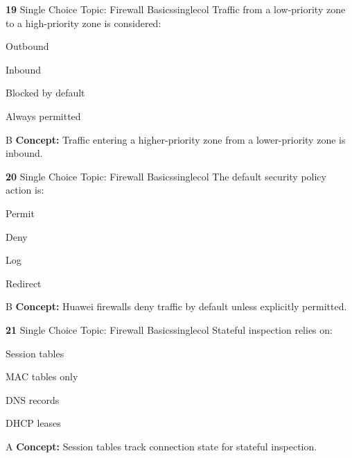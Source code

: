 \documentclass[10pt,a4paper]{article}
\begin{document}
\begin{qcard}{\color{white}\textbf{19} \hfill \small Single Choice \textbar{} Topic: Firewall Basics}{singlecol}
Traffic from a low-priority zone to a high-priority zone is considered:

\begin{qoptions}
\item Outbound
\item Inbound
\item Blocked by default
\item Always permitted
\end{qoptions}
\begin{explainbox}{B}
\textbf{Concept:} Traffic entering a higher-priority zone from a lower-priority zone is inbound.
\end{explainbox}
\end{qcard}

\begin{qcard}{\color{white}\textbf{20} \hfill \small Single Choice \textbar{} Topic: Firewall Basics}{singlecol}
The default security policy action is:

\begin{qoptions}
\item Permit
\item Deny
\item Log
\item Redirect
\end{qoptions}
\begin{explainbox}{B}
\textbf{Concept:} Huawei firewalls deny traffic by default unless explicitly permitted.
\end{explainbox}
\end{qcard}

\begin{qcard}{\color{white}\textbf{21} \hfill \small Single Choice \textbar{} Topic: Firewall Basics}{singlecol}
Stateful inspection relies on:

\begin{qoptions}
\item Session tables
\item MAC tables only
\item DNS records
\item DHCP leases
\end{qoptions}
\begin{explainbox}{A}
\textbf{Concept:} Session tables track connection state for stateful inspection.
\end{explainbox}
\end{qcard}
\end{document}
